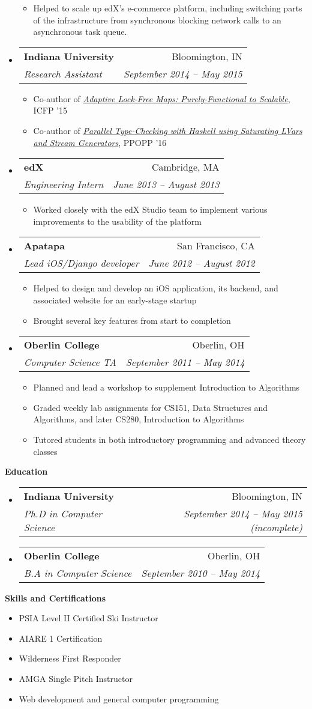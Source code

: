 \documentclass[letterpaper,11pt]{article}
\makeatletter
\newcommand{\resitem}[1]{\item #1 \vspace{-2pt}}
\newcommand{\resheading}[1]{{\large{\begin{minipage}{\textwidth}{\textbf{#1\vphantom{p\^{E}}}}\end{minipage}}}}
\newcommand{\ressubheading}[4]{
  \begin{tabular*}{6.5in}{l@{\extracolsep{\fill}}r}
    \textbf{#1} & #2 \\
    \textit{#3} & \textit{#4} \\
  \end{tabular*}\vspace{-6pt}}
\makeatother
\begin{document}
\begin{itemize}
\begin{itemize}
    \resitem{Helped to scale up edX's e-commerce platform, including switching parts of the infrastructure from synchronous blocking network calls to an asynchronous task queue.}
  \end{itemize}
\item
  \ressubheading{Indiana University}{Bloomington, IN}{Research Assistant}{September 2014 -- May 2015}
  \begin{itemize}
  \resitem{Co-author of \href{http://www.cs.indiana.edu/~rrnewton/papers/icfp15_adaptive_data.pdf}{\textit{Adaptive Lock-Free Maps: Purely-Functional to Scalable}}, ICFP '15}
  \resitem{Co-author of \href{https://dl.acm.org/citation.cfm?id=2851142}{\textit{Parallel Type-Checking with Haskell using Saturating LVars and Stream Generators}}, PPOPP '16}
  \end{itemize}
\item
  \ressubheading{edX}{Cambridge, MA}{Engineering Intern}{June 2013 -- August 2013}
  \begin{itemize}
  \resitem{Worked closely with the edX Studio team to implement various improvements to the usability of the platform}
  \end{itemize}
\item
  \ressubheading{Apatapa}{San Francisco, CA}{Lead iOS/Django developer}{June 2012 -- August 2012}
  \begin{itemize}
    \resitem{Helped to design and develop an iOS application, its backend, and associated website for an early-stage startup}
    \resitem{Brought several key features from start to completion}
  \end{itemize}
\item
  \ressubheading{Oberlin College}{Oberlin, OH}{Computer Science TA}{September 2011 -- May 2014}
  \begin{itemize}
    \resitem{Planned and lead a workshop to supplement Introduction to Algorithms}
    \resitem{Graded weekly lab assignments for CS151, Data Structures and Algorithms, and later CS280, Introduction to Algorithms}
    \resitem{Tutored students in both introductory programming and advanced theory classes}
  \end{itemize}
\end{itemize}

\resheading{Education}
\begin{itemize}
\item
  \ressubheading{Indiana University}{Bloomington, IN}{Ph.D in Computer Science}{September 2014 -- May 2015 (incomplete)}
\item
  \ressubheading{Oberlin College}{Oberlin, OH}{B.A in Computer Science}{September 2010 -- May 2014}
\end{itemize}

\resheading{Skills and Certifications}
\begin{itemize}
\item PSIA Level II Certified Ski Instructor
\item AIARE 1 Certification
\item Wilderness First Responder
\item AMGA Single Pitch Instructor
\item Web development and general computer programming
\end{itemize}
\end{document}
